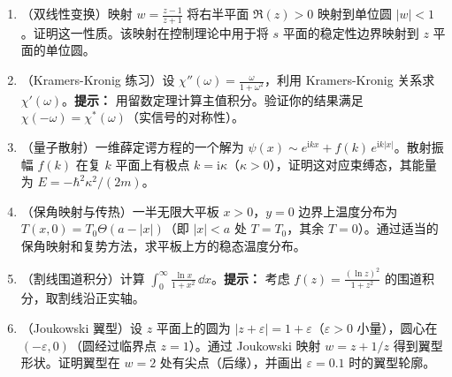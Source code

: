\begin{enumerate}
\item[13.]（双线性变换）映射 $w = \frac{z-1}{z+1}$ 将右半平面 $\Re(z)>0$ 映射到单位圆 $|w|<1$。证明这一性质。该映射在控制理论中用于将 $s$ 平面的稳定性边界映射到 $z$ 平面的单位圆。
\item[14.]（Kramers-Kronig 练习）设 $\chi''(\omega) = \frac{\omega}{1+\omega^2}$，利用 Kramers-Kronig 关系求 $\chi'(\omega)$。\textbf{提示：} 用留数定理计算主值积分。验证你的结果满足 $\chi(-\omega) = \chi^*(\omega)$（实信号的对称性）。
\item[15.]（量子散射）一维薛定谔方程的一个解为 $\psi(x) \sim e^{\mathrm{i}kx} + f(k)\,e^{\mathrm{i}k|x|}$。散射振幅 $f(k)$ 在复 $k$ 平面上有极点 $k=\mathrm{i}\kappa$（$\kappa>0$），证明这对应束缚态，其能量为 $E = -\hbar^2\kappa^2/(2m)$。
\item[16.]（保角映射与传热）一半无限大平板 $x>0$，$y=0$ 边界上温度分布为 $T(x,0)=T_0\Theta(a-|x|)$（即 $|x|<a$ 处 $T=T_0$，其余 $T=0$）。通过适当的保角映射和复势方法，求平板上方的稳态温度分布。
\item[17.]（割线围道积分）计算 $\displaystyle\int_0^{\infty} \frac{\ln x}{1+x^2}\,\dd x$。\textbf{提示：} 考虑 $f(z) = \frac{(\ln z)^2}{1+z^2}$ 的围道积分，取割线沿正实轴。
\item[18.]（Joukowski 翼型）设 $z$ 平面上的圆为 $|z + \varepsilon| = 1 + \varepsilon$（$\varepsilon>0$ 小量），圆心在 $(-\varepsilon,0)$（圆经过临界点 $z=1$）。通过 Joukowski 映射 $w = z + 1/z$ 得到翼型形状。证明翼型在 $w=2$ 处有尖点（后缘），并画出 $\varepsilon=0.1$ 时的翼型轮廓。
\end{enumerate}
